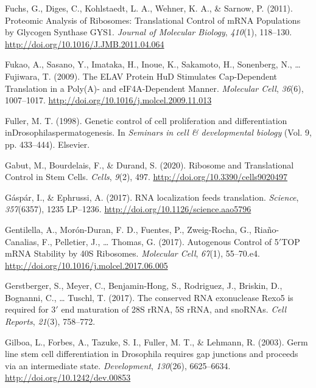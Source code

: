 \documentclass[12pt,twoside]{reedthesis}
\newlength{\cslhangindent}
\newenvironment{cslreferences}%
  {\setlength{\parindent}{0pt}%
  \everypar{\setlength{\hangindent}{\cslhangindent}}\ignorespaces}%
  {\par}
\begin{document}
\begin{cslreferences}
\leavevmode\hypertarget{ref-fuchsProteomicAnalysisRibosomes2011}{}%
Fuchs, G., Diges, C., Kohlstaedt, L. A., Wehner, K. A., \& Sarnow, P. (2011). Proteomic Analysis of Ribosomes: Translational Control of mRNA Populations by Glycogen Synthase GYS1. \emph{Journal of Molecular Biology}, \emph{410}(1), 118--130. \url{http://doi.org/10.1016/J.JMB.2011.04.064}

\leavevmode\hypertarget{ref-Fukao2009c}{}%
Fukao, A., Sasano, Y., Imataka, H., Inoue, K., Sakamoto, H., Sonenberg, N., \ldots{} Fujiwara, T. (2009). The ELAV Protein HuD Stimulates Cap-Dependent Translation in a Poly(A)- and eIF4A-Dependent Manner. \emph{Molecular Cell}, \emph{36}(6), 1007--1017. \url{http://doi.org/10.1016/j.molcel.2009.11.013}

\leavevmode\hypertarget{ref-Fuller1998c}{}%
Fuller, M. T. (1998). Genetic control of cell proliferation and differentiation inDrosophilaspermatogenesis. In \emph{Seminars in cell \& developmental biology} (Vol. 9, pp. 433--444). Elsevier.

\leavevmode\hypertarget{ref-gabutRibosomeTranslationalControl2020}{}%
Gabut, M., Bourdelais, F., \& Durand, S. (2020). Ribosome and Translational Control in Stem Cells. \emph{Cells}, \emph{9}(2), 497. \url{http://doi.org/10.3390/cells9020497}

\leavevmode\hypertarget{ref-Gaspar2017b}{}%
Gáspár, I., \& Ephrussi, A. (2017). RNA localization feeds translation. \emph{Science}, \emph{357}(6357), 1235 LP--1236. \url{http://doi.org/10.1126/science.aao5796}

\leavevmode\hypertarget{ref-gentilellaAutogenousControlTOP2017}{}%
Gentilella, A., Morón-Duran, F. D., Fuentes, P., Zweig-Rocha, G., Riaño-Canalias, F., Pelletier, J., \ldots{} Thomas, G. (2017). Autogenous Control of 5\({'}\)TOP mRNA Stability by 40S Ribosomes. \emph{Molecular Cell}, \emph{67}(1), 55--70.e4. \url{http://doi.org/10.1016/j.molcel.2017.06.005}

\leavevmode\hypertarget{ref-Gerstberger2017}{}%
Gerstberger, S., Meyer, C., Benjamin-Hong, S., Rodriguez, J., Briskin, D., Bognanni, C., \ldots{} Tuschl, T. (2017). The conserved RNA exonuclease Rexo5 is required for 3\({'}\) end maturation of 28S rRNA, 5S rRNA, and snoRNAs. \emph{Cell Reports}, \emph{21}(3), 758--772.

\leavevmode\hypertarget{ref-gilboaGermLineStem2003}{}%
Gilboa, L., Forbes, A., Tazuke, S. I., Fuller, M. T., \& Lehmann, R. (2003). Germ line stem cell differentiation in Drosophila requires gap junctions and proceeds via an intermediate state. \emph{Development}, \emph{130}(26), 6625--6634. \url{http://doi.org/10.1242/dev.00853}


\end{cslreferences}
\end{document}
